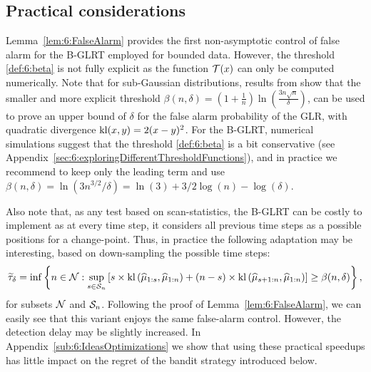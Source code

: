 \subsection{Practical considerations}\label{sub:6:PracticalConsiderations}

Lemma~\ref{lem:6:FalseAlarm} provides the first non-asymptotic control of false alarm for the B-GLRT employed for bounded data. However, the threshold \eqref{def:6:beta} is not fully explicit as the function $\mathcal{T}(x)$ can only be computed numerically.
Note that for sub-Gaussian distributions, results from \cite{Maillard2018GLR} show that the smaller and more explicit threshold
$\beta(n,\delta) = \left(1 + \frac{1}{n}\right)\ln\left(\frac{3n\sqrt{n}}{\delta}\right)$,
can be used to prove an upper bound of $\delta$ for the false alarm probability of the GLR, with quadratic divergence $\mathrm{kl}(x,y)=2(x-y)^2$.
%
For the B-GLRT, numerical simulations suggest that the threshold \eqref{def:6:beta} is a bit conservative (see Appendix~\ref{sec:6:exploringDifferentThresholdFunctions}), and in practice we recommend to keep only the leading term and use $\beta(n,\delta) = \ln(3n^{3/2}/\delta) = \ln(3) + 3/2\log(n) - \log(\delta)$.

Also note that, as any test based on scan-statistics, the B-GLRT can be costly to implement as at every time step, it considers all previous time steps as a possible positions for a change-point. Thus, in practice the following adaptation may be interesting, based on down-sampling the possible time steps:
%
\begin{equation}\label{def:6:GLRTricks}
    \widetilde{\tau}_{\delta} = \inf \left\{ n \in \mathcal{N} : \sup_{s \in \mathcal{S}_n} \left[s \times \mathrm{kl}\left(\widehat{\mu}_{1:s},\widehat{\mu}_{1:n}\right) + (n-s) \times \mathrm{kl}\left(\widehat{\mu}_{s+1:n},\widehat{\mu}_{1:n}\right)\right] \geq \beta(n,\delta)\right\},
\end{equation}
%
for subsets $\mathcal{N}$ and $\mathcal{S}_n$. Following the proof of Lemma~\ref{lem:6:FalseAlarm}, we can easily see that this variant enjoys the same false-alarm control.
However, the detection delay may be slightly increased.
In Appendix~\ref{sub:6:IdeasOptimizations} we show that using these practical speedups
has little impact on the regret of the bandit strategy introduced below.



